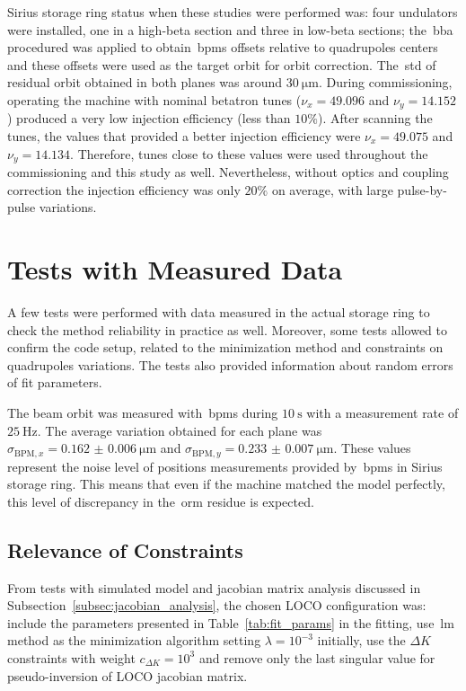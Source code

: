 Sirius storage ring status when these studies were performed was: four undulators were installed, one in a high-beta section and three in low-beta sections; the~\gls{bba} procedured was applied to obtain~\glspl{bpm} offsets relative to quadrupoles centers and these offsets were used as the target orbit for orbit correction. The~\gls{std} of residual orbit obtained in both planes was around $\SI{30}{\micro\meter}$. During commissioning, operating the machine with nominal betatron tunes ($\nu_x = 49.096$ and $\nu_y = 14.152$) produced a very low injection efficiency (less than $10\%$). After scanning the tunes, the values that provided a better injection efficiency were $\nu_x = 49.075$ and $\nu_y = 14.134$. Therefore, tunes close to these values were used throughout the commissioning and this study as well. Nevertheless, without optics and coupling correction the injection efficiency was only $20\%$ on average, with large pulse-by-pulse variations.
\section{Tests with Measured Data}\label{sec:tests_measured}
A few tests were performed with data measured in the actual storage ring to check the method reliability in practice as well. Moreover, some tests allowed to confirm the code setup, related to the minimization method and constraints on quadrupoles variations. The tests also provided information about random errors of fit parameters.

The beam orbit was measured with~\glspl{bpm} during $\SI{10}{\second}$ with a measurement rate of $\SI{25}{\hertz}$. The average variation obtained for each plane was $\sigma_{\mathrm{BPM}, x} = \SI{0.162(6)}{\micro\meter}$ and $\sigma_{\mathrm{BPM}, y} = \SI{0.233(7)}{\micro\meter}$. These values represent the noise level of positions measurements provided by~\glspl{bpm} in Sirius storage ring. This means that even if the machine matched the model perfectly, this level of discrepancy in the~\gls{orm} residue is expected.

\subsection{Relevance of Constraints}\label{subsec:loco_config}
From tests with simulated model and jacobian matrix analysis discussed in Subsection~\ref{subsec:jacobian_analysis}, the chosen LOCO configuration was: include the parameters presented in Table~\ref{tab:fit_params} in the fitting, use~\gls{lm} method as the minimization algorithm setting $\lambda = 10^{-3}$ initially, use the $\Delta K$ constraints with weight $c_{\Delta K} = 10^{3}$ and remove only the last singular value for pseudo-inversion of LOCO jacobian matrix. 


